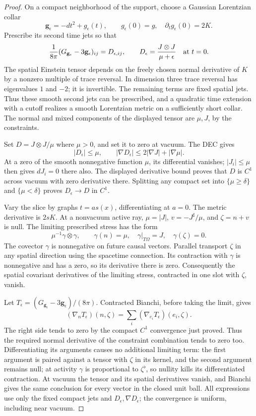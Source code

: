 \begin{proof}
On a compact neighborhood of the support, choose a Gaussian
Lorentzian collar
\[
 \mathbf g_\epsilon=-dt^2+g_\epsilon(t),\qquad
 g_\epsilon(0)=g,\quad \partial_tg_\epsilon(0)=2K.
\]
Prescribe its second time jets so that
\[
 \frac1{8\pi}(G_{\mathbf g_\epsilon}-3\mathbf g_\epsilon)_{ij}
       =D_{\epsilon,ij},\qquad
 D_\epsilon=\frac{J\otimes J}{\mu+\epsilon}
 \quad\hbox{at }t=0.
\]
The spatial Einstein tensor depends on the freely chosen normal
derivative of \(K\) by a nonzero multiple of trace reversal.  In
dimension three trace reversal has eigenvalues \(1\) and \(-2\);
it is invertible.  The remaining terms are fixed spatial jets.
Thus these smooth second jets can be prescribed, and a quadratic
time extension with a cutoff realizes a smooth Lorentzian metric
on a sufficiently short collar.  The normal and mixed components
of the displayed tensor are \(\mu,J\), by the constraints.

Set \(D=J\otimes J/\mu\) where \(\mu>0\), and set it to zero at
vacuum.  The DEC gives
\[
 |D_\epsilon|\leq\mu,\qquad
 |\nabla D_\epsilon|\leq2|\nabla J|+|\nabla\mu|.
\]
At a zero of the smooth nonnegative function \(\mu\), its differential
vanishes; \(|J_i|\leq\mu\) then gives \(dJ_i=0\) there also.
The displayed derivative bound proves that \(D\) is \(C^1\) across
vacuum with zero derivative there.  Splitting any compact set into
\(\{\mu\geq\delta\}\) and \(\{\mu<\delta\}\) proves
\(D_\epsilon\to D\) in \(C^1\).

Vary the slice by graphs \(t=a s(x)\), differentiating at \(a=0\).
The metric derivative is \(2sK\).  At a nonvacuum active ray,
\(\mu=|J|\), \(v=-J^\sharp/\mu\), and \(\zeta=n+v\) is null.
The limiting prescribed stress has the form
\[
 \mu^{-1}\gamma\otimes\gamma,\qquad
 \gamma(n)=\mu,\quad\gamma|_{T\Omega}=J,\quad\gamma(\zeta)=0.
\]
The covector \(\gamma\) is nonnegative on future causal vectors.
Parallel transport \(\zeta\) in any spatial direction using the
spacetime connection.  Its contraction with \(\gamma\) is
nonnegative and has a zero, so its derivative there is zero.
Consequently the spatial covariant derivatives of the limiting
stress, contracted in one slot with \(\zeta\), vanish.

Let \(T_\epsilon=(G_{\mathbf g_\epsilon}-3\mathbf g_\epsilon)/(8\pi)\).
Contracted Bianchi, before taking the limit, gives
\[
 (\nabla_nT_\epsilon)(n,\zeta)
       =\sum_i(\nabla_{e_i}T_\epsilon)(e_i,\zeta).
\]
The right side tends to zero by the compact \(C^1\) convergence just
proved.  Thus the required normal derivative of the constraint
combination tends to zero too.  Differentiating its arguments causes
no additional limiting term: the first argument is paired against
a tensor with \(\zeta\) in its kernel, and the second argument remains
null; at activity \(\gamma\) is proportional to \(\zeta^\flat\), so
nullity kills its differentiated contraction.  At vacuum the tensor
and its spatial derivatives vanish, and Bianchi gives the same
conclusion for every vector in the closed unit ball.  All expressions
use only the fixed compact jets and \(D_\epsilon,\nabla D_\epsilon\);
the convergence is uniform, including near vacuum.
\end{proof}

